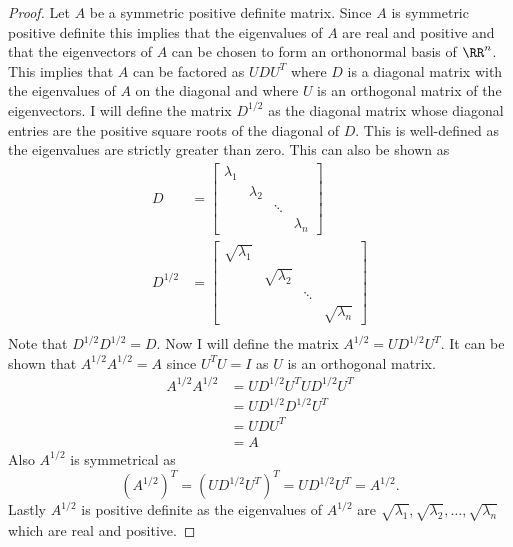 \documentclass[11pt, oneside]{article}
\begin{document}
\begin{enumerate}
    \begin{proof}
      Let $A$ be a symmetric positive definite matrix.
      Since $A$ is symmetric positive definite this implies that the
      eigenvalues of $A$ are real and positive and that the eigenvectors of
      $A$ can be chosen to form an orthonormal basis of $\RR^n$.
      This implies that $A$ can be factored as $UDU^T$ where $D$ is a diagonal
      matrix with the eigenvalues of $A$ on the diagonal and where $U$ is an
      orthogonal matrix of the eigenvectors.
      I will define the matrix $D^{1/2}$ as the diagonal matrix whose diagonal
      entries are the positive square roots of the diagonal of $D$.
      This is well-defined as the eigenvalues are strictly greater than zero.
      This can also be shown as
      \begin{align*}
        D &=
        \begin{bmatrix}
          \lambda_1 & & \\
           & \lambda_2 & & \\
           & & \ddots & \\
           & & & \lambda_n
        \end{bmatrix} \\
        D^{1/2} &= 
        \begin{bmatrix}
          \sqrt{\lambda_1} & & \\
           & \sqrt{\lambda_2} & & \\
           & & \ddots & \\
           & & & \sqrt{\lambda_n}
        \end{bmatrix} \\
      \end{align*}
      Note that $D^{1/2} D^{1/2} = D$.
      Now I will define the matrix $A^{1/2} = U D^{1/2} U^T$.
      It can be shown that $A^{1/2} A^{1/2} = A$ since $U^T U = I$ as $U$ is an
      orthogonal matrix.
      \begin{align*}
        A^{1/2} A^{1/2} &= U D^{1/2} U^TU D^{1/2} U^T \\
        &= U D^{1/2} D^{1/2} U^T \\
        &= U D U^T \\
        &= A
      \end{align*}
      Also $A^{1/2}$ is symmetrical as
      \[
        (A^{1/2})^T = (U D^{1/2} U^T)^T = U D^{1/2} U^T = A^{1/2}.
      \]
      Lastly $A^{1/2}$ is positive definite as the eigenvalues of $A^{1/2}$ are
      $\sqrt{\lambda_1}, \sqrt{\lambda_2}, \ldots, \sqrt{\lambda_n}$ which are
      real and positive.


\end{proof}
\end{enumerate}
\end{document}
